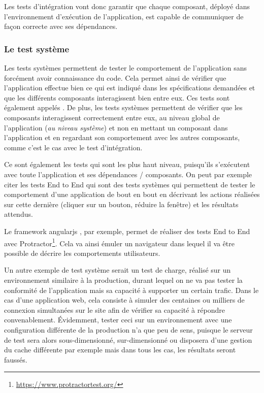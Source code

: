 
Les tests d'intégration vont donc garantir que chaque composant, déployé dans l'environnement d'exécution de l'application, est capable de communiquer de façon correcte avec ses dépendances.

\subsubsection{Le test système}

Les tests systèmes permettent de tester le comportement de l'application sans forcément avoir connaissance du code. Cela permet ainsi de vérifier que l'application effectue bien ce qui est indiqué dans les spécifications demandées et que les différents composants interagissent bien entre eux. Ces tests sont également appelés . De plus, les tests systèmes permettent de vérifier que les composants interagissent correctement entre eux, au niveau global de l'application (\emph{au niveau système}) et non en mettant un composant dans l'application et en regardant son comportement avec les autres composants, comme c'est le cas avec le test d'intégration.

Ce sont également les tests qui sont les plus haut niveau, puisqu'ils s'exécutent avec toute l'application et ses dépendances / composants. On peut par exemple citer les tests End to End qui sont des tests systèmes qui permettent de tester le comportement d'une application de bout en bout en décrivant les actions réalisées sur cette dernière (cliquer sur un bouton, réduire la fenêtre) et les résultats attendus.

Le \gls{framework} \gls{angularjs} , par exemple, permet de réaliser des tests End to End avec Protractor\footnote{\url{https://www.protractortest.org/}}. Cela va ainsi émuler un navigateur dans lequel il va être possible de décrire les comportements utilisateurs. 

Un autre exemple de test système serait un test de charge, réalisé sur un environnement similaire à la production, durant lequel on ne va pas tester la conformité de l'application mais sa capacité à supporter un certain trafic. Dans le cas d'une application web, cela consiste à simuler des centaines ou milliers de connexion simultanées sur le site afin de vérifier sa capacité à répondre convenablement. Évidemment, tester ceci sur un environnement avec une configuration différente de la production n'a que peu de sens, puisque le serveur de test sera alors sous-dimensionné, sur-dimensionné ou disposera d'une gestion du cache différente par exemple mais dans tous les cas, les résultats seront faussés.

